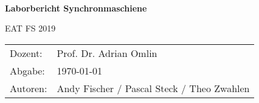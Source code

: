 \pagestyle{scrheadings} %
\begin{titlepage}

\begin{center}

\noindent\makebox[\linewidth]{\rule{15cm}{0.4pt}}\\ 
\vspace{10mm}
\textbf{\Huge Laborbericht Synchronmaschiene}\\[2ex]
\vspace{10mm}
\begin{large}
EAT FS 2019\\
\end{large} 
\vspace{0.5cm}	%
\noindent\makebox[\linewidth]{\rule{15cm}{0.4pt}} 
\vspace{40mm}


\begin{tabular}{ll}
Dozent:  & \quad Prof. Dr. Adrian Omlin\\[2ex]
Abgabe: & \quad \today\\
Autoren:& \quad Andy Fischer / Pascal Steck / Theo Zwahlen\\

\end{tabular}

\end{center}

\end{titlepage}

